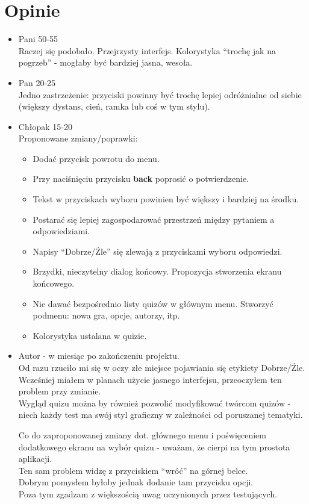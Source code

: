 \documentclass[12pt, a4paper]{article}
\begin{document}
\section{Opinie}
\begin{itemize}
\item Pani 50-55\\
Raczej się podobało. Przejrzysty interfejs. Kolorystyka ``trochę jak na pogrzeb'' - mogłaby być bardziej jasna, wesoła.
\item Pan 20-25\\
Jedno zastrzeżenie: przyciski powinny być trochę lepiej odróżnialne od siebie (większy dystans, cień, ramka lub coś w tym stylu).
\item Chłopak 15-20\\
Proponowane zmiany/poprawki:
\begin{itemize}
\item Dodać przycisk powrotu do menu.
\item Przy naciśnięciu przycisku \textbf{back} poprosić o potwierdzenie.
\item Tekst w przyciskach wyboru powinien być większy i bardziej na środku.
\item Postarać się lepiej zagospodarować przestrzeń między pytaniem a odpowiedziami.
\item Napisy ``Dobrze/Źle'' się zlewają z przyciskami wyboru odpowiedzi.
\item Brzydki, nieczytelny dialog końcowy. Propozycja stworzenia ekranu końcowego.
\item Nie dawać bezpośrednio listy quizów w głównym menu. Stworzyć podmenu: nowa gra, opcje, autorzy, itp.
\item Kolorystyka ustalana w quizie.
\end{itemize}
\item Autor - w miesiąc po zakończeniu projektu.\\
Od razu rzuciło mi się w oczy złe miejsce pojawiania się etykiety Dobrze/Źle. Wcześniej miałem w planach użycie jasnego interfejsu, przeoczyłem ten problem przy zmianie.\\
Wygląd quizu można by również pozwolić modyfikować twórcom quizów - niech każdy test ma swój styl graficzny w zależności od poruszanej tematyki.

Co do zaproponowanej zmiany dot. głównego menu i poświęceniem dodatkowego ekranu na wybór quizu - uważam, że cierpi na tym prostota aplikacji.\\
Ten sam problem widzę z przyciskiem ``wróć'' na górnej belce.\\
Dobrym pomysłem byłoby jednak dodanie tam przycisku opcji.\\

Poza tym zgadzam z większością uwag uczynionych przez testujących.\\
\end{itemize}
\newpage
\end{document}
